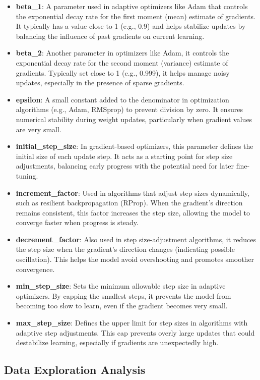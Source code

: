 \documentclass[conference]{IEEEtran}
\begin{document}
\begin{itemize}
    \item \textbf{beta\_1}: A parameter used in adaptive optimizers like Adam that controls the exponential decay rate for the first moment (mean) estimate of gradients. It typically has a value close to 1 (e.g., 0.9) and helps stabilize updates by balancing the influence of past gradients on current learning.
    \item \textbf{beta\_2}: Another parameter in optimizers like Adam, it controls the exponential decay rate for the second moment (variance) estimate of gradients. Typically set close to 1 (e.g., 0.999), it helps manage noisy updates, especially in the presence of sparse gradients.
    \item \textbf{epsilon}: A small constant added to the denominator in optimization algorithms (e.g., Adam, RMSprop) to prevent division by zero. It ensures numerical stability during weight updates, particularly when gradient values are very small.
    \item \textbf{initial\_step\_size}: In gradient-based optimizers, this parameter defines the initial size of each update step. It acts as a starting point for step size adjustments, balancing early progress with the potential need for later fine-tuning.
    \item \textbf{increment\_factor}: Used in algorithms that adjust step sizes dynamically, such as resilient backpropagation (RProp). When the gradient's direction remains consistent, this factor increases the step size, allowing the model to converge faster when progress is steady.
    \item \textbf{decrement\_factor}: Also used in step size-adjustment algorithms, it reduces the step size when the gradient's direction changes (indicating possible oscillation). This helps the model avoid overshooting and promotes smoother convergence.
    \item \textbf{min\_step\_size}: Sets the minimum allowable step size in adaptive optimizers. By capping the smallest steps, it prevents the model from becoming too slow to learn, even if the gradient becomes very small.
    \item \textbf{max\_step\_size}: Defines the upper limit for step sizes in algorithms with adaptive step adjustments. This cap prevents overly large updates that could destabilize learning, especially if gradients are unexpectedly high.
\end{itemize}

\subsection{Data Exploration Analysis}
\end{document}
